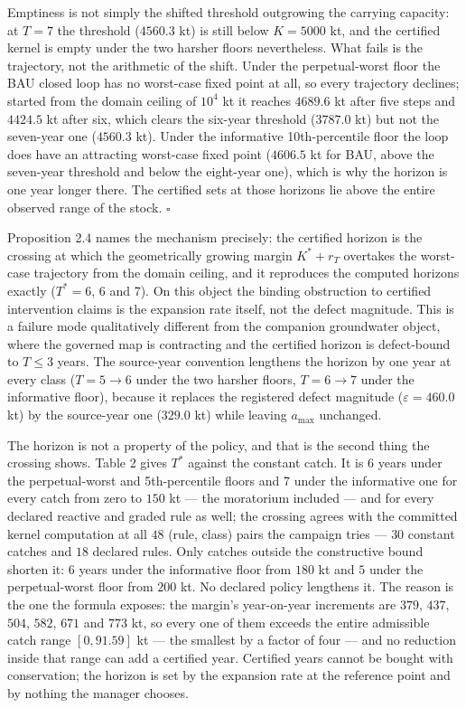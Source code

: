 Emptiness is not simply the shifted threshold outgrowing the carrying
capacity: at \(T = 7\) the threshold (\(4560.3\) kt) is still below
\(K = 5000\) kt, and the certified kernel is empty under the two
harsher floors nevertheless. What fails is the trajectory, not the
arithmetic of the shift. Under the perpetual-worst floor the BAU closed
loop has no worst-case fixed point at all, so every trajectory declines;
started from the domain ceiling of \(10^4\) kt it reaches \(4689.6\)
kt after five steps and \(4424.5\) kt after six, which clears the
six-year threshold (\(3787.0\) kt) but not the seven-year one
(\(4560.3\) kt). Under the informative 10th-percentile floor the loop
does have an attracting worst-case fixed point (\(4606.5\) kt for BAU,
above the seven-year threshold and below the eight-year one), which is
why the horizon is one year longer there. The certified sets at those
horizons lie above the entire observed range of the stock. \ensuremath{\square}

Proposition 2.4 names the mechanism precisely: the certified horizon is
the crossing at which the geometrically growing margin
\(K^* + r_T\) overtakes the worst-case trajectory from the domain
ceiling, and it reproduces the computed horizons exactly
(\(T^* = 6\), 6 and 7). On this object the binding obstruction to
certified intervention claims is the expansion rate itself, not the
defect magnitude. This is a
failure mode qualitatively different from the companion groundwater
object, where the governed map is contracting and the certified horizon
is defect-bound to \(T \le 3\) years. The source-year convention
lengthens the horizon by one year at every class (\(T = 5 \to 6\)
under the two harsher floors, \(T = 6 \to 7\) under the informative
floor), because it replaces the registered defect magnitude
(\(\varepsilon = 460.0\) kt) by the source-year one (\(329.0\) kt)
while leaving \(a_{\max}\) unchanged.

The horizon is not a property of the policy, and that is the second
thing the crossing shows. Table 2 gives \(T^*\) against the constant catch.
It is 6 years under the perpetual-worst and 5th-percentile floors and 7 under
the informative one for every catch from zero to \(150\) kt --- the
moratorium included --- and for every declared reactive and graded rule as
well; the crossing agrees with the committed kernel computation at all
\(48\) (rule, class) pairs the campaign tries --- \(30\) constant
catches and \(18\) declared rules. Only catches outside the constructive bound
shorten it: \(6\) years under the informative floor from \(180\) kt and
\(5\) under the perpetual-worst floor from \(200\) kt. No declared policy
lengthens it. The reason is the one the formula exposes: the margin's
year-on-year increments are \(379\), \(437\), \(504\), \(582\),
\(671\) and \(773\) kt, so every one of them exceeds the entire
admissible catch range \([0, 91.59]\) kt --- the smallest by a factor
of four --- and no reduction inside that range can add a certified year.
Certified years
cannot be bought with conservation; the horizon is set by the expansion rate
at the reference point and by nothing the manager chooses.

